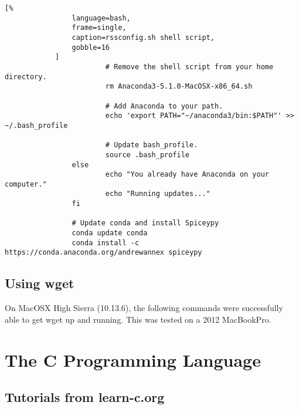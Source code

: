 \documentclass[crop=false,class=book,oneside]{standalone}
\begin{document}
\begin{lstlisting}[%
                language=bash,
                frame=single,
                caption=rssconfig.sh shell script,
                gobble=16
            ]
                        # Remove the shell script from your home directory.
                        rm Anaconda3-5.1.0-MacOSX-x86_64.sh
                
                        # Add Anaconda to your path.
                        echo 'export PATH="~/anaconda3/bin:$PATH"' >> ~/.bash_profile
                
                        # Update bash_profile.
                        source .bash_profile
                else
                        echo "You already have Anaconda on your computer."
                        echo "Running updates..."
                fi
                
                # Update conda and install Spiceypy
                conda update conda
                conda install -c https://conda.anaconda.org/andrewannex spiceypy
            \end{lstlisting}
        \subsection{Using wget}
            On MacOSX High Sierra (10.13.6), the following commands
            were successfully able to get wget up and running.
            This was tested on a 2012 MacBookPro.
    \section{The C Programming Language}
        \subsection{Tutorials from learn-c.org}
\end{document}
